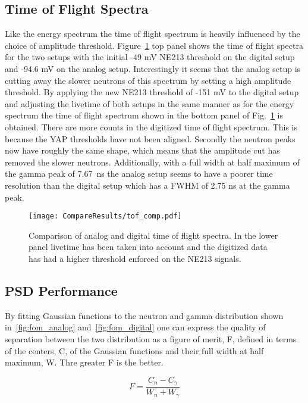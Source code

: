 \documentclass[main.tex]{subfiles}
\begin{document}
\subsection{Time of Flight Spectra}
Like the energy spectrum the time of flight spectrum is heavily influenced by the choice of amplitude threshold. Figure~\ref{fig:tof_comp} top panel shows the time of flight spectra for the two setups with the initial -49 mV NE213 threshold on the digital setup and -94.6 mV on the analog setup. Interestingly it seems that the analog setup is cutting away the slower neutrons of this spectrum by setting a high amplitude threshold. By applying the new NE213 threshold of -151 mV to the digital setup and adjusting the livetime of both setups in the same manner as for the energy spectrum the time of flight spectrum shown in the bottom panel of Fig.~\ref{fig:tof_comp} is obtained. There are more counts in the digitized time of flight spectrum. This is because the YAP thresholds have not been aligned. Secondly the neutron peaks now have roughly the same shape, which means that the amplitude cut has removed the slower neutrons. Additionally, with a full width at half maximum of the gamma peak of \SI{7.67}{\ns} the analog setup seems to have a poorer time resolution than the digital setup which has a FWHM of 2.75 ns at the gamma peak.

\begin{figure}[h]
    \centering
        \texttt{[image: CompareResults/tof\_comp.pdf]}
        \caption[Comparison of analog and digital time of flight spectra.]{Comparison of analog and digital time of flight spectra. In the lower panel livetime has been taken into account and the digitized data has had a higher threshold enforced on the NE213 signals.}
    \label{fig:tof_comp}
\end{figure}

\subsection{PSD Performance}
By fitting Gaussian functions to the neutron and gamma distribution shown in~\ref{fig:fom_analog} and~\ref{fig:fom_digital} one can express the quality of separation between the two distribution as a figure of merit, F, defined in terms of the centers, C, of the Gaussian functions and their full width at half maximum, W. Thre greater F is the better.

\begin{equation}
F = \frac{C_n - C_\gamma}{W_n + W_\gamma}
\end{equation}
\end{document}
